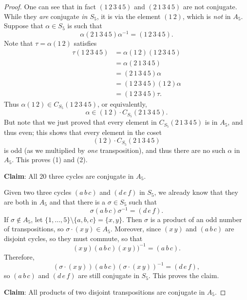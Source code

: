 \documentclass[12pt]{report}
\numberwithin{equation}{section}
\numberwithin{theorem}{chapter}
\theoremstyle{definition}
\newtheorem*{basic properties}{Basic Properties}
\newtheorem*{Important Remark}{Important Remark}
\begin{document}
\begin{proof}
One can see that in fact $(1 \, 2 \, 3 \, 4 \, 5)$ and $(2 \, 1 \, 3 \, 4 \, 5)$ are not conjugate.
While they {\em are} conjugate {\em in $S_5$}, it is via the element $(1 \,2)$, which is {\em not} in $A_5$.
Suppose that $\alpha \in S_5$ is such that
$$\alpha (2 \, 1 \, 3 \, 4 \, 5) \alpha^{-1} = (1 \, 2 \, 3 \, 4 \, 5).$$
Note that $\tau = \alpha (1 \, 2)$ satisfies
$$\begin{aligned}
\tau (1 \, 2 \, 3 \, 4 \, 5) & =  \alpha (1 \, 2) (1 \, 2 \, 3 \, 4 \, 5) \\
& = \alpha (2 \, 1 \, 3 \, 4 \, 5) \\
& = (2 \, 1 \, 3 \, 4 \, 5) \alpha \\
& = (1 \, 2 \, 3 \, 4 \, 5) (1 \, 2) \alpha \\
& = (1 \, 2 \, 3 \, 4 \, 5) \tau.
\end{aligned}$$
Thus $\alpha (1 \, 2) \in C_{S_5}(1 \, 2 \, 3 \, 4 \, 5)$, or equivalently, 
$$\alpha \in (1 \, 2) \cdot C_{S_5}(2 \, 1 \, 3 \, 4 \, 5).$$
But note that we just proved that every element in $C_{S_5}(2 \, 1 \, 3 \, 4 \, 5)$ is in $A_5$, and thus even; this shows that every element in the coset 
$$(1 \, 2) \cdot C_{S_5}(2 \, 1 \, 3 \, 4 \, 5)$$
is odd (as we multiplied by \emph{one} transposition), and thus there are no such $\alpha$ in $A_5$.
This proves (1) and (2).





{\bf Claim}: All $20$ three cycles are conjugate in $A_5$.



Given two three cycles $(a \, b \, c)$ and $(d \, e \, f)$ in $S_5$, we already know that they are both in $A_5$ and that there is a $\sigma \in S_5$ such that
$$
\sigma (a \, b \, c) \sigma^{-1}  = (d \, e \, f).
$$
If $\sigma \notin A_5$, let $\{1, \dots, 5\} \setminus \{a,b,c\} = \{ x, y\}$. Then $\sigma$ is a product of an odd number of transpositions, so $\sigma \cdot (x \, y) \in A_5$. Moreover, since $(x \, y)$ and $(a \, b \, c)$ are disjoint cycles, so they must commute, so that
$$(x \, y) (a \, b \, c) (x \, y))^{-1} = (a \, b \, c).$$
Therefore,
$$(\sigma \cdot (x \, y)) (a \, b \, c) (\sigma \cdot (x \, y))^{-1}  = (d \, e \, f),$$
so $(a \, b \, c)$ and $(d \, e \, f)$ are still conjugate in $S_5$.
This proves the claim.

\vspace{1.5em}

{\bf Claim}: All products of two disjoint transpositions are conjugate in $A_5$.


\end{proof}
\end{document}
